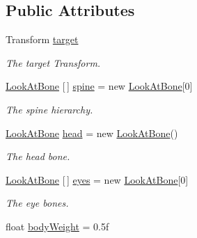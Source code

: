 \subsection*{Public Attributes}
\begin{DoxyCompactItemize}
\item 
Transform \mbox{\hyperlink{class_root_motion_1_1_final_i_k_1_1_i_k_solver_look_at_a238d9010e1b97fa699b316f4284394d8}{target}}
\begin{DoxyCompactList}\small\item\em The target Transform. \end{DoxyCompactList}\item 
\mbox{\hyperlink{class_root_motion_1_1_final_i_k_1_1_i_k_solver_look_at_1_1_look_at_bone}{Look\+At\+Bone}} \mbox{[}$\,$\mbox{]} \mbox{\hyperlink{class_root_motion_1_1_final_i_k_1_1_i_k_solver_look_at_a856ceade46766c164526b7d3d23e010e}{spine}} = new \mbox{\hyperlink{class_root_motion_1_1_final_i_k_1_1_i_k_solver_look_at_1_1_look_at_bone}{Look\+At\+Bone}}\mbox{[}0\mbox{]}
\begin{DoxyCompactList}\small\item\em The spine hierarchy. \end{DoxyCompactList}\item 
\mbox{\hyperlink{class_root_motion_1_1_final_i_k_1_1_i_k_solver_look_at_1_1_look_at_bone}{Look\+At\+Bone}} \mbox{\hyperlink{class_root_motion_1_1_final_i_k_1_1_i_k_solver_look_at_a915ee6b32f5db3f0ff7e38b773a8e6ef}{head}} = new \mbox{\hyperlink{class_root_motion_1_1_final_i_k_1_1_i_k_solver_look_at_1_1_look_at_bone}{Look\+At\+Bone}}()
\begin{DoxyCompactList}\small\item\em The head bone. \end{DoxyCompactList}\item 
\mbox{\hyperlink{class_root_motion_1_1_final_i_k_1_1_i_k_solver_look_at_1_1_look_at_bone}{Look\+At\+Bone}} \mbox{[}$\,$\mbox{]} \mbox{\hyperlink{class_root_motion_1_1_final_i_k_1_1_i_k_solver_look_at_a04b9336c41f6eccfba6c0ab8066ccaca}{eyes}} = new \mbox{\hyperlink{class_root_motion_1_1_final_i_k_1_1_i_k_solver_look_at_1_1_look_at_bone}{Look\+At\+Bone}}\mbox{[}0\mbox{]}
\begin{DoxyCompactList}\small\item\em The eye bones. \end{DoxyCompactList}\item 
float \mbox{\hyperlink{class_root_motion_1_1_final_i_k_1_1_i_k_solver_look_at_a40750b4da8c784f94c0b166458b9c8d5}{body\+Weight}} = 0.\+5f

\end{DoxyCompactItemize}
